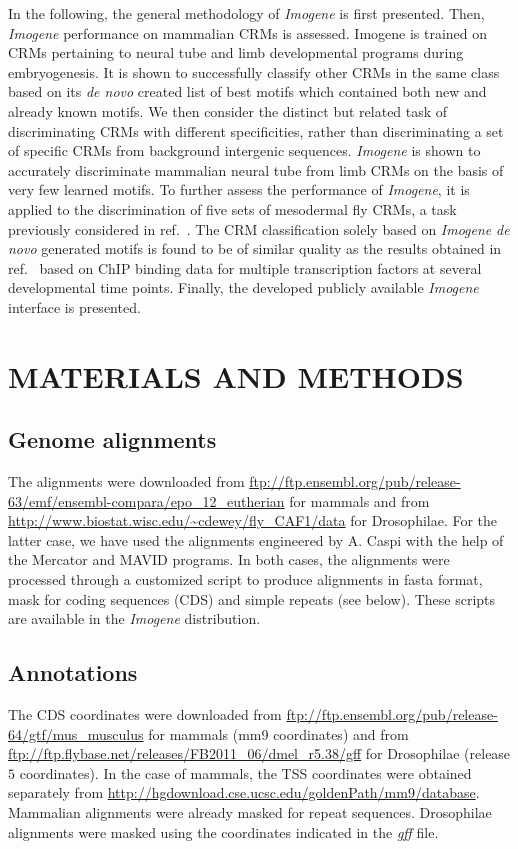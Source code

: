 \documentclass[a4,center,fleqn]{NAR}
\begin{document}
In the following, the general methodology of {\em Imogene} is first presented.
Then, {\em Imogene} performance on mammalian CRMs is assessed.
Imogene is trained on CRMs pertaining to  neural tube and limb developmental
programs during embryogenesis.
It is shown to successfully classify other CRMs in the same class based on its
{\em de novo} created list of best motifs which contained both new and already
known motifs. 
We then consider the distinct but related task of discriminating CRMs with
different specificities, rather than discriminating a set of specific CRMs from
background intergenic sequences.
{\em Imogene} is shown to accurately discriminate mammalian neural tube from
limb CRMs on the basis of very few learned motifs.
To further assess the performance of {\em Imogene}, it is applied to the
discrimination of five sets of  mesodermal fly CRMs, a task previously
considered in ref.~\cite{pmid19890324}.
The CRM classification solely based on {\em Imogene} {\em de novo} generated
motifs is found to be of similar quality as the results obtained in
ref.~\cite{pmid19890324} based on ChIP binding data for multiple transcription
factors at several developmental time points.
Finally, the developed publicly available {\em Imogene}  interface is
presented.




\section{MATERIALS AND METHODS}

\subsection*{Genome alignments}
The alignments were downloaded from
\url{ftp://ftp.ensembl.org/pub/release-63/emf/ensembl-compara/epo_12_eutherian}
for mammals and from \url{http://www.biostat.wisc.edu/~cdewey/fly_CAF1/data}
for Drosophilae.
For the latter case, we have used the alignments engineered by A. Caspi with
the help of the Mercator and MAVID programs.
In both cases, the alignments were processed through a customized script to
produce alignments in fasta format, mask for coding sequences (CDS) and simple
repeats (see below).
These scripts are available in the {\em Imogene} distribution.

\subsection*{Annotations}
The CDS coordinates were downloaded from
\url{ftp://ftp.ensembl.org/pub/release-64/gtf/mus_musculus} for mammals (mm9
coordinates) and from
\url{ftp://ftp.flybase.net/releases/FB2011_06/dmel_r5.38/gff} for Drosophilae
(release $5$ coordinates).
In the case of mammals, the TSS coordinates were obtained separately from
\url{http://hgdownload.cse.ucsc.edu/goldenPath/mm9/database}.
Mammalian alignments  were already masked for repeat sequences.
Drosophilae alignments were masked using the coordinates indicated in the
\textit{gff} file.
\end{document}
